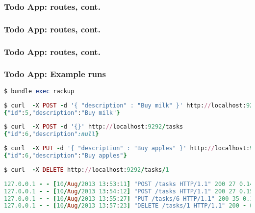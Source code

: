 \documentclass{beamer}
\begin{document}
\begin{frame}[fragile]\frametitle{Todo App: routes, cont.} 
  
  
    
\end{frame}



\begin{frame}[fragile]\frametitle{Todo App: routes, cont.} 
  
  
    
\end{frame}




\begin{frame}[fragile]\frametitle{Todo App: routes, cont.} 
  
  
    
\end{frame}




\begin{frame}[fragile]\frametitle{Todo App: Example runs} 
  
  \begin{lstlisting}[language=ruby, escapechar={^}]
$ bundle exec rackup
  \end{lstlisting}

  \begin{lstlisting}[language=ruby, escapechar={^}]
$ curl  -X POST -d '{ "description" : "Buy milk" }' http://localhost:9292/tasks
{"id":5,"description":"Buy milk"}
  \end{lstlisting}

  \begin{lstlisting}[language=ruby, escapechar={^}]
$ curl  -X POST -d '{}' http://localhost:9292/tasks
{"id":6,"description":null}
  \end{lstlisting}

  \begin{lstlisting}[language=ruby, escapechar={^}]
$ curl  -X PUT -d '{ "description" : "Buy apples" }' http://localhost:9292/tasks/6
{"id":6,"description":"Buy apples"}
  \end{lstlisting}

  \begin{lstlisting}[language=ruby, escapechar={^}]
$ curl  -X DELETE http://localhost:9292/tasks/1
  \end{lstlisting}

  \begin{lstlisting}[language=ruby, basicstyle=\tiny, escapechar={^}]
127.0.0.1 - - [10/Aug/2013 13:53:11] "POST /tasks HTTP/1.1" 200 27 0.1428
127.0.0.1 - - [10/Aug/2013 13:54:12] "POST /tasks HTTP/1.1" 200 27 0.1544
127.0.0.1 - - [10/Aug/2013 13:55:27] "PUT /tasks/6 HTTP/1.1" 200 35 0.1576
127.0.0.1 - - [10/Aug/2013 13:57:23] "DELETE /tasks/1 HTTP/1.1" 200 - 0.1502
  \end{lstlisting}

\end{frame}
\end{document}
